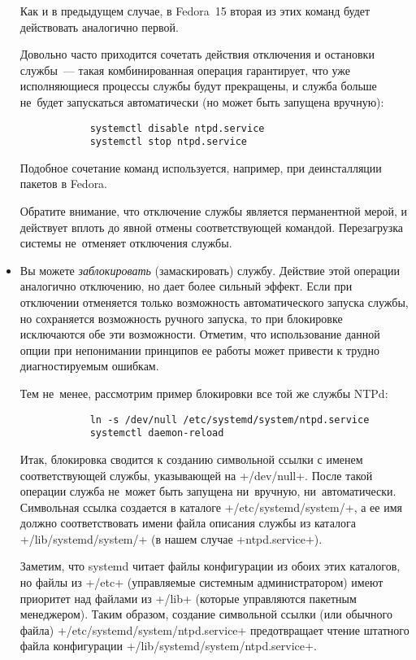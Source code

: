 \documentclass[10pt,oneside,a4paper]{article}
\begin{document}
\begin{itemize}
		Как и в предыдущем случае, в Fedora~15 вторая из этих команд
		будет действовать аналогично первой.

		Довольно часто приходится сочетать действия отключения и
		остановки службы~--- такая комбинированная операция
		гарантирует, что уже исполняющиеся процессы службы будут
		прекращены, и служба больше не~будет запускаться автоматически
		(но может быть запущена вручную):
		\begin{Verbatim}
			systemctl disable ntpd.service
			systemctl stop ntpd.service
		\end{Verbatim}
		Подобное сочетание команд используется,
		например, при деинсталляции пакетов в Fedora.

		Обратите внимание, что отключение службы является перманентной
		мерой, и действует вплоть до явной отмены соответствующей
		командой. Перезагрузка системы не~отменяет отключения службы.

	\item Вы можете \emph{заблокировать} (замаскировать) службу. Действие
		этой операции аналогично отключению, но дает более сильный
		эффект. Если при отключении отменяется только возможность
		автоматического запуска службы, но сохраняется возможность
		ручного запуска, то при блокировке исключаются обе эти
		возможности. Отметим, что использование данной опции при
		непонимании принципов ее работы может привести к трудно
		диагностируемым ошибкам.

		Тем не~менее, рассмотрим пример блокировки все той же службы NTPd:
		\begin{Verbatim}
			ln -s /dev/null /etc/systemd/system/ntpd.service
			systemctl daemon-reload
		\end{Verbatim}

		Итак, блокировка сводится к созданию символьной ссылки
		с именем соответствующей службы, указывающей на +/dev/null+.
		После такой операции служба не~может быть запущена ни~вручную,
		ни~автоматически. Символьная ссылка создается в каталоге
		+/etc/systemd/system/+, а ее имя должно соответствовать имени
		файла описания службы из каталога +/lib/systemd/system/+ (в
		нашем случае +ntpd.service+).

		Заметим, что systemd читает файлы конфигурации из обоих этих
		каталогов, но файлы из +/etc+ (управляемые системным
		администратором) имеют приоритет над файлами из +/lib+ (которые
		управляются пакетным менеджером). Таким образом, создание
		символьной ссылки (или обычного файла)
		+/etc/systemd/system/ntpd.service+ предотвращает чтение
		штатного файла конфигурации +/lib/systemd/system/ntpd.service+.


\end{itemize}
\end{document}
